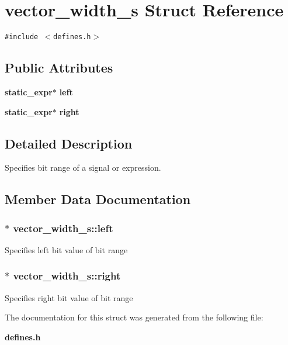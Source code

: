 \section{vector\_\-width\_\-s  Struct Reference}
\label{structvector__width__s}
{\tt \#include $<$defines.h$>$}

\subsection*{Public Attributes}
\begin{CompactItemize}
\item 
{\bf static\_\-expr}$\ast$ {\bf left}
\item 
{\bf static\_\-expr}$\ast$ {\bf right}
\end{CompactItemize}


\subsection{Detailed Description}
Specifies bit range of a signal or expression. 



\subsection{Member Data Documentation}
\subsubsection{ $\ast$ vector\_\-width\_\-s::left}\label{structvector__width__s_m0}


Specifies left bit value of bit range 
\subsubsection{ $\ast$ vector\_\-width\_\-s::right}\label{structvector__width__s_m1}


Specifies right bit value of bit range 

The documentation for this struct was generated from the following file:\begin{CompactItemize}
\item 
{\bf defines.h}\end{CompactItemize}
